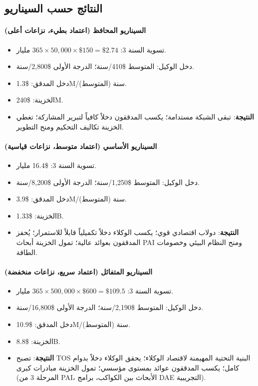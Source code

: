 \documentclass[11pt]{article}
\begin{document}
\subsection{النتائج حسب السيناريو}
\paragraph{السيناريو المحافظ (اعتماد بطيء، نزاعات أعلى)}
\begin{itemize}[noitemsep]
  \item تسوية السنة 3: $365 \times 50{,}000 \times \$150 = \$2.74$ مليار.
  \item دخل الوكيل: المتوسط \$410/سنة؛ الدرجة الأولى \$2{,}800/سنة.
  \item دخل المدقق: \$1.3M/سنة (المتوسط).
  \item الخزينة: \$240M.
  \item \textbf{النتيجة}: تبقى الشبكة مستدامة؛ يكسب المدققون دخلاً كافياً لتبرير المشاركة؛ تغطي الخزينة تكاليف التحكيم ومنح التطوير.
\end{itemize}

\paragraph{السيناريو الأساسي (اعتماد متوسط، نزاعات قياسية)}
\begin{itemize}[noitemsep]
  \item تسوية السنة 3: \$16.4 مليار.
  \item دخل الوكيل: المتوسط \$1{,}250/سنة؛ الدرجة الأولى \$8{,}200/سنة.
  \item دخل المدقق: \$3.9M/سنة (المتوسط).
  \item الخزينة: \$1.33B.
  \item \textbf{النتيجة}: دولاب اقتصادي قوي؛ يكسب الوكلاء دخلاً تكميلياً قابلاً للاستمرار؛ يُحفز المدققون بعوائد عالية؛ تمول الخزينة أبحاث PAI ومنح النظام البيئي وخصومات الطاقة.
\end{itemize}

\paragraph{السيناريو المتفائل (اعتماد سريع، نزاعات منخفضة)}
\begin{itemize}[noitemsep]
  \item تسوية السنة 3: $365 \times 500{,}000 \times \$600 = \$109.5$ مليار.
  \item دخل الوكيل: المتوسط \$2{,}190/سنة؛ الدرجة الأولى \$16{,}800/سنة.
  \item دخل المدقق: \$10.9M/سنة (المتوسط).
  \item الخزينة: \$8.8B.
  \item \textbf{النتيجة}: تصبح TOS البنية التحتية المهيمنة لاقتصاد الوكلاء؛ يحقق الوكلاء دخلاً بدوام كامل؛ يكسب المدققون عوائد بمستوى مؤسسي؛ تمول الخزينة مبادرات كبرى (المرحلة 3 من PAI، الأبحاث بين الكواكب، برامج DAE التجريبية).
\end{itemize}
\end{document}
